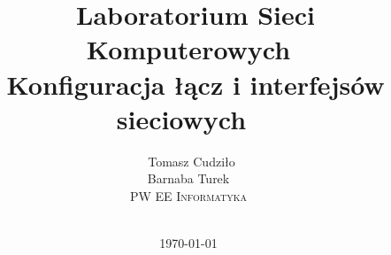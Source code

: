 \title{\
Laboratorium Sieci Komputerowych\\\
Konfiguracja łącz i interfejsów sieciowych\
}
\author{\
Tomasz Cudziło\\
Barnaba Turek\\
\textsc{PW EE Informatyka}\\[10pt]\
}
\date{\today}
